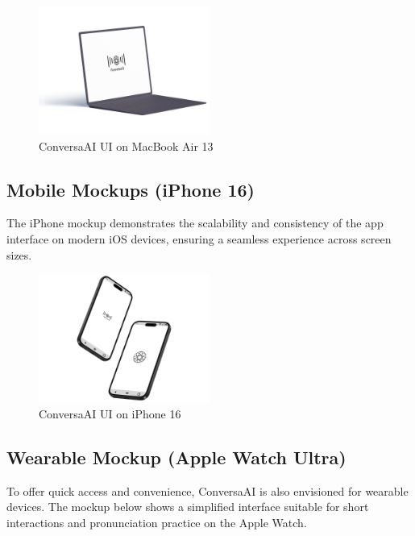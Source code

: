 \documentclass[12pt]{article}
\begin{document}
\begin{figure}[h!]
    \centering
    \includegraphics[width=0.5\textwidth]{MacBook_Air_13.png} %
    \caption{ConversaAI UI on MacBook Air 13}
    \label{fig:macbook_ui}
\end{figure}

\newpage

\subsection*{Mobile Mockups (iPhone 16)}

The iPhone mockup demonstrates the scalability and consistency of the app interface on modern iOS devices, ensuring a seamless experience across screen sizes.

\begin{figure}[h!]
    \centering
    \includegraphics[width=0.5\textwidth]{iPhone_16.png} %
    \caption{ConversaAI UI on iPhone 16}
    \label{fig:iphone_ui}
\end{figure}

\subsection*{Wearable Mockup (Apple Watch Ultra)}

To offer quick access and convenience, ConversaAI is also envisioned for wearable devices. The mockup below shows a simplified interface suitable for short interactions and pronunciation practice on the Apple Watch.
\end{document}
